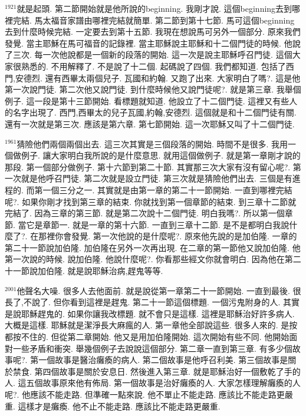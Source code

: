 \documentclass{book}
\begin{document}
$^{1921}$就是起頭.
第二節開始就是他所說的beginning.
我剛才說.
這個beginning去到哪裡完結.
馬太福音家譜由哪裡完結就簡單.
第二節到第十七節.
馬可這個beginning去到什麼時候完結.
一定要去到第十五節.
我現在想說馬可另外一個部分.
原來我們發覺.
當主耶穌在馬可福音的記錄裡.
當主耶穌說主耶穌和十二個門徒的時候.
他說了三次.
每一次他說都是一個新的段落的開始.
這一次是說主耶穌呼召門徒.
這個大家很熟悉的.
不用解釋了.
不是說了十二個.
起碼說了四個.
我們都知道.
包括了西門,安德烈.
還有西畢太兩個兒子.
瓦國和約翰.
又跑了出來.
大家明白了嗎?.
這是他第一次說門徒.
第二次他又說門徒.
到什麼時候他又說門徒呢?.
就是第三章.
我舉個例子.
這一段是第十三節開始.
看標題就知道.
他設立了十二個門徒.
這裡又有些人的名字出現了.
西門,西畢太的兒子瓦國,約翰,安德烈.
這個就是和十二個門徒有關.
還有一次就是第三次.
應該是第六章.
第七節開始.
這一次耶穌又叫了十二個門徒.

$^{1961}$猜險他們兩個兩個出去.
這三次其實是三個段落的開始.
時間不是很多.
我用一個做例子.
讓大家明白我所說的是什麼意思.
就用這個做例子.
就是第一章剛才說的那段.
第一個部分做例子.
第十六節到第二十節.
其實那三次大家有沒有留心呢?.
第一次就是他呼召門徒.
第二次就是設立門徒.
第三次就是猜險他們出去.
三個是有進程的.
而第一個三分之一.
其實就是由第一章的第二十一節開始.
一直到哪裡完結呢?.
如果你剛才找到第三章的結束.
你就找到第一個章節的結束.
到三章十二節就完結了.
因為三章的第三節.
就是第二次說十二個門徒.
明白我嗎?.
所以第一個章節.
當它是章節一.
就是一章的第十六節.
一直到三章十二節.
是不是都明白我說什麼了?.
在那裡你會發覺.
第一次他說的是什麼呢?.
原來他先說的是加伯隆.
一章的第二十一節說加伯隆.
加伯隆在另外一次再出現.
在二章的第一節他又說加伯隆.
他第一次說的時候.
說加伯隆.
他說什麼呢?.
你看那些經文你就會明白.
因為他在第二十一節說加伯隆.
就是說耶穌治病,趕鬼等等.

$^{2001}$他聲名大噪.
很多人去他面前.
就是說從第一章第二十一節開始.
一直到最後.
很長了,不說了.
但你看到這裡是趕鬼.
第二十一節這個標題.
一個污鬼附身的人.
其實是說耶穌趕鬼的.
如果你讓我改標題.
就不會只是這樣.
這裡是耶穌治好許多病人.
大概是這樣.
耶穌就是潔淨長大麻瘋的人.
第一章他全部說這些.
很多人來的.
是按都按不住的.
但從第二章開始.
他又是用加伯隆開始.
這次開始有些不同.
他開始面對一些矛盾和衝突.
舉幾個例子去說說這個部分.
第二章一直到第三章.
有多少個故事呢?.
第一個故事是醫治癱瘓的病人.
第二個故事是他呼召利美.
第三個故事是關於禁食.
第四個故事是關於安息日.
然後進入第三章.
就是耶穌治好一個敷乾了手的人.
這五個故事原來他有佈局.
第一個故事是治好癱瘓的人.
大家怎樣理解癱瘓的人呢?.
他應該不能走路.
但準確一點來說.
他不單止不能走路.
應該比不能走路更嚴重.
這樣才是癱瘓.
他不止不能走路.
應該比不能走路更嚴重.
\end{document}
